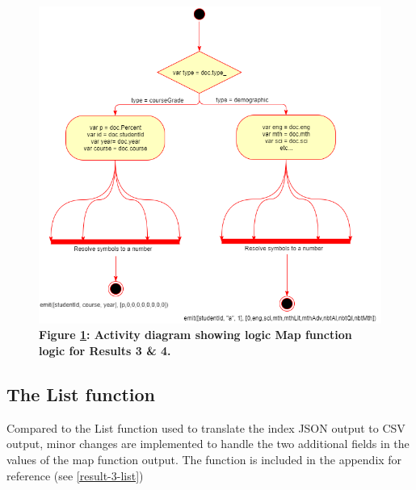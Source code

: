 \begin{figure}[ht]
    \centering
    \begin{mdframed}
        \centering
        \includegraphics[scale=0.35]{./resources/figures/activity-diagram-1.png}
    \end{mdframed}
    \caption[Result 1 Map function]{\textbf{Figure \ref{result-3-map-fn}: Activity diagram showing logic Map function logic for Results 3 \& 4.}}
    \label{result-3-map-fn}
\end{figure}

\subsection*{The List function}
Compared to the List function used to translate the index JSON output to CSV output, minor changes are implemented to handle the two additional fields in the values of the map function output. The function is included in the appendix for reference (see \ref{result-3-list})